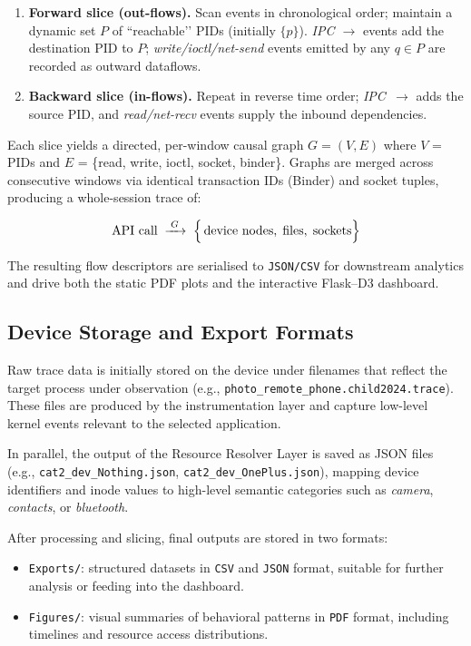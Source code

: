 \documentclass[a4paper,12pt]{report}
\begin{document}
\begin{enumerate}
  \item \textbf{Forward slice (out-flows).}
        Scan events in chronological order; maintain a dynamic set
        $P$ of “reachable’’ PIDs (initially $\{p\}$).
        \emph{IPC $\rightarrow$} events add the destination PID to $P$;
        \emph{write/ioctl/net-send} events emitted by any
        $q\!\in\!P$ are recorded as outward dataflows.
  \item \textbf{Backward slice (in-flows).}
        Repeat in reverse time order; \emph{IPC~$\rightarrow$} adds
        the source PID, and \emph{read/net-recv} events supply the
        inbound dependencies.
\end{enumerate}

Each slice yields a directed, per-window causal graph
$G=(V,E)$ where
$V$ = PIDs and $E$ = \{read, write, ioctl, socket, binder\}.
Graphs are merged across consecutive windows via identical
transaction IDs (Binder) and socket tuples, producing a
whole-session trace of:

\[
  \text{API call} \;\xrightarrow{\;G\;}\;
  \Bigl\{\,
     \text{device nodes},\;
     \text{files},\;
     \text{sockets}
  \Bigr\}
\]

\noindent
The resulting flow descriptors are serialised to
\texttt{JSON/CSV} for downstream analytics and drive both the static
PDF plots and the interactive Flask–D3 dashboard.


\subsection{Device Storage and Export Formats}

Raw trace data is initially stored on the device under filenames that reflect the target process under observation (e.g., \texttt{photo\_remote\_phone.child2024.trace}). These files are produced by the instrumentation layer and capture low-level kernel events relevant to the selected application.

In parallel, the output of the Resource Resolver Layer is saved as JSON files (e.g., \texttt{cat2\_dev\_Nothing.json}, \texttt{cat2\_dev\_OnePlus.json}), mapping device identifiers and inode values to high-level semantic categories such as \emph{camera}, \emph{contacts}, or \emph{bluetooth}.

After processing and slicing, final outputs are stored in two formats:
\begin{itemize}
  \item \texttt{Exports/}: structured datasets in \texttt{CSV} and \texttt{JSON} format, suitable for further analysis or feeding into the dashboard.
  \item \texttt{Figures/}: visual summaries of behavioral patterns in \texttt{PDF} format, including timelines and resource access distributions.
\end{itemize}
\end{document}
